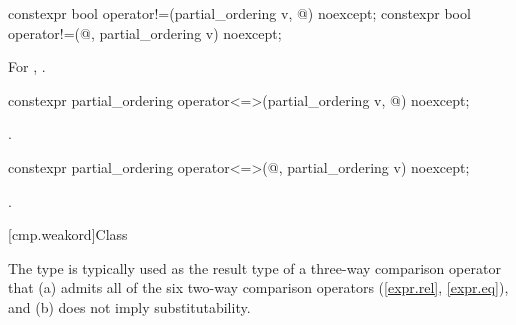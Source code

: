 %
\begin{itemdecl}
constexpr bool operator!=(partial_ordering v, @\unspec@) noexcept;
constexpr bool operator!=(@\unspec@, partial_ordering v) noexcept;
\end{itemdecl}

\begin{itemdescr}
\pnum
\returns
For , .
\end{itemdescr}

%
\begin{itemdecl}
constexpr partial_ordering operator<=>(partial_ordering v, @\unspec@) noexcept;
\end{itemdecl}

\begin{itemdescr}
\pnum
\returns
{}.
\end{itemdescr}

%
\begin{itemdecl}
constexpr partial_ordering operator<=>(@\unspec@, partial_ordering v) noexcept;
\end{itemdecl}

\begin{itemdescr}
\pnum
\returns
{}.
\end{itemdescr}

[cmp.weakord]{Class }

\pnum
The  type is typically used
as the result type of a three-way comparison operator
that (a) admits all of the six two-way comparison operators (\ref{expr.rel}, \ref{expr.eq}),
and (b) does not imply substitutability.

